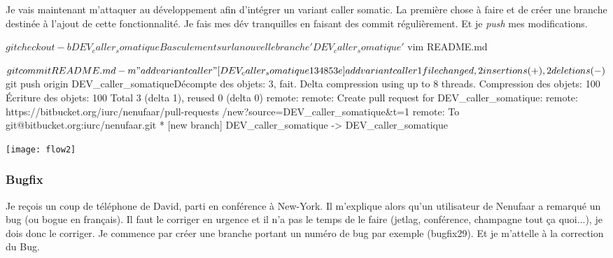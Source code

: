 \documentclass[12pt,a4paper]{article}
\begin{document}
Je vais maintenant m'attaquer au développement afin d'intégrer un variant caller somatic. La première chose à faire et de créer une branche destinée à l'ajout de cette fonctionnalité. Je fais mes dév tranquilles en faisant des commit régulièrement. Et je \emph{push} mes modifications.

\vspace{1cm}

{
\begin{boxedverbatim}
$ git checkout -b DEV_caller_somatique
Basculement sur la nouvelle branche 'DEV_caller_somatique'

$ vim README.md

$ git commit README.md -m "add variant caller"
[DEV_caller_somatique 134853e] add variant caller
 1 file changed, 2 insertions(+), 2 deletions(-)
 
$ git push origin DEV_caller_somatiqueDécompte des objets: 3, fait.
Delta compression using up to 8 threads.
Compression des objets: 100%
Écriture des objets: 100%
Total 3 (delta 1), reused 0 (delta 0)
remote: 
remote: Create pull request for DEV_caller_somatique:
remote:   https://bitbucket.org/iurc/nenufaar/pull-requests
/new?source=DEV_caller_somatique&t=1
remote: 
To git@bitbucket.org:iurc/nenufaar.git
 * [new branch]      DEV_caller_somatique -> DEV_caller_somatique
\end{boxedverbatim}
}

\vspace{1cm}

\texttt{[image: flow2]}

\newpage

\subsubsection{Bugfix}

Je reçois un coup de téléphone de David, parti en conférence à New-York. Il m'explique alors qu'un utilisateur de Nenufaar a remarqué un bug (ou bogue en français). Il faut le corriger en urgence et il n'a pas le temps de le faire (jetlag, conférence, champagne tout ça quoi...), je dois donc le corriger. Je commence par créer une branche portant un numéro de bug par exemple (bugfix29). Et je m'attelle à la correction du Bug.

\vspace{1cm}
\end{document}
